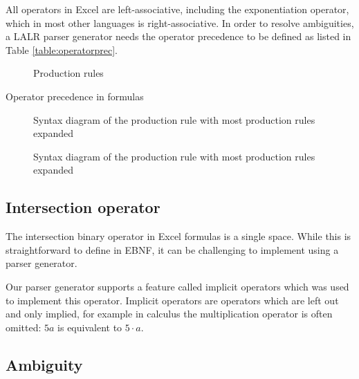 \documentclass[conference]{IEEEtran}
\begin{document}
All operators in Excel are left-associative, including the exponentiation operator, which in most other languages is right-associative.
In order to resolve ambiguities, a LALR parser generator needs the operator precedence to be defined as listed in Table \ref{table:operatorprec}.

\begin{figure}[p]
\caption{Production rules}
\label{figure:productions}
\centering

\end{figure}

\begin{table}[p]
	\centering
	\caption{Operator precedence in formulas}
	\label{table:operatorprec}
	
\end{table}

\begin{figure}[p]
	\caption{Syntax diagram of the  production rule with most production rules expanded}
	\label{figure:Formula}
	
\end{figure}

\begin{figure}[p]
	\caption{Syntax diagram of the  production rule with most production rules expanded}
	\label{figure:Reference}
	\centering
	
\end{figure}

\subsection{Intersection operator}

The intersection binary operator in Excel formulas is a single space.
While this is straightforward to define in EBNF, it can be challenging to implement using a parser generator.

Our parser generator supports a feature called implicit operators which was used to implement this operator.
Implicit operators are operators which are left out and only implied, for example in calculus the multiplication operator is often omitted: $5a$ is equivalent to $5 \cdot a$.

\subsection{Ambiguity}
\label{sec:ambiguity}
\end{document}
